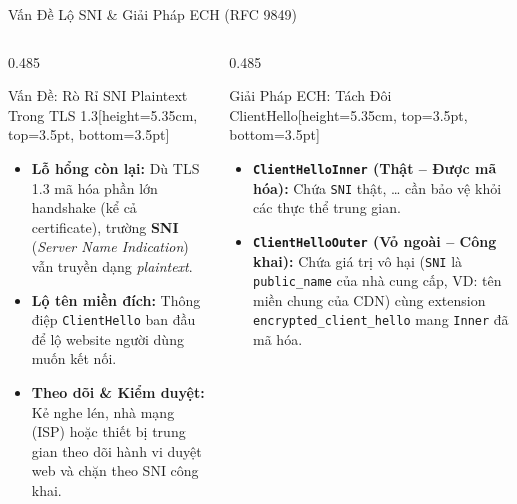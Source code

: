 \documentclass[aspectratio=169, 10pt]{beamer}
\begin{document}
\begin{frame}{Vấn Đề Lộ SNI \& Giải Pháp ECH (RFC 9849)}
	\begin{columns}[T]
		\begin{column}{0.485\textwidth}
			\begin{accentcard}[uetblue]{Vấn Đề: Rò Rỉ SNI Plaintext Trong TLS 1.3}[height=5.35cm, top=3.5pt, bottom=3.5pt]
				\raggedright
				\setlength{\leftmargini}{9pt}
				\begin{itemize}\setlength{\itemsep}{8pt}\setlength{\topsep}{0pt}\fontsize{6.8pt}{8.8pt}\selectfont
					\item \textbf{Lỗ hổng còn lại:} Dù TLS 1.3 mã hóa phần lớn handshake (kể cả certificate), trường \textbf{SNI} (\textit{Server Name Indication}) vẫn truyền dạng \textit{plaintext}.
					\item \textbf{Lộ tên miền đích:} Thông điệp \texttt{ClientHello} ban đầu để lộ website người dùng muốn kết nối.
					\item \textbf{Theo dõi \& Kiểm duyệt:} Kẻ nghe lén, nhà mạng (ISP) hoặc thiết bị trung gian theo dõi hành vi duyệt web và chặn theo SNI công khai.
				\end{itemize}
			\end{accentcard}
		\end{column}

		\begin{column}{0.485\textwidth}
			\begin{accentcard}[uetgreen]{Giải Pháp ECH: Tách Đôi ClientHello}[height=5.35cm, top=3.5pt, bottom=3.5pt]
				\raggedright
				\setlength{\leftmargini}{9pt}
				\begin{itemize}\setlength{\itemsep}{10pt}\setlength{\topsep}{0pt}\fontsize{6.8pt}{8.8pt}\selectfont
					\item \textbf{\texttt{ClientHelloInner} (Thật -- Được mã hóa):} Chứa \texttt{SNI} thật, \ldots{} cần bảo vệ khỏi các thực thể trung gian.
					\item \textbf{\texttt{ClientHelloOuter} (Vỏ ngoài -- Công khai):} Chứa giá trị vô hại (\texttt{SNI} là \texttt{public\_name} của nhà cung cấp, VD: tên miền chung của CDN) cùng extension \texttt{encrypted\_client\_hello} mang \texttt{Inner} đã mã hóa.
				\end{itemize}
			\end{accentcard}
		\end{column}
	\end{columns}
\end{frame}
\end{document}
